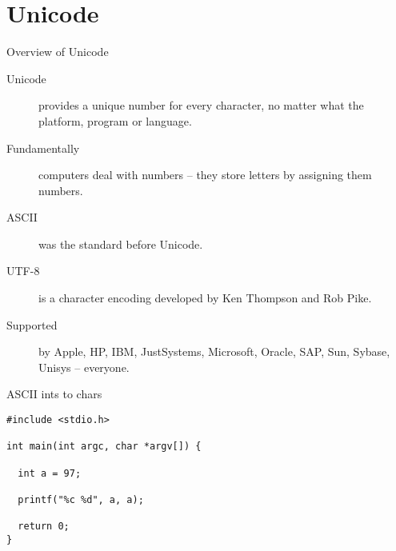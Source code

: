 
\section{Unicode}

\begin{frame}{Overview of Unicode}
  \begin{description}
    \item[Unicode] provides a unique number for every character, no matter what the platform, program or language.
    \item[Fundamentally] computers deal with numbers -- they store letters by assigning them numbers.
    \item[ASCII] was the standard before Unicode.
    \item[UTF-8] is a character encoding developed by Ken Thompson and Rob Pike.
    \item[Supported] by Apple, HP, IBM, JustSystems, Microsoft, Oracle, SAP, Sun, Sybase, Unisys -- everyone.
  \end{description}
\end{frame}

\begin{frame}[fragile]{ASCII ints to chars}
  \begin{verbatim}
#include <stdio.h>

int main(int argc, char *argv[]) {

  int a = 97;
  
  printf("%c %d", a, a);

  return 0;
}
  \end{verbatim}
\end{frame}